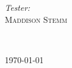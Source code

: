 \begin{titlepage}
\begin{center}
\begin{minipage}{0.4\textwidth}
\begin{flushleft} \large
\emph{Tester:}\\
 \textsc{Maddison Stemm}
\end{flushleft}
\end{minipage}
\begin{minipage}{0.4\textwidth}
\begin{flushright} \large
\end{flushright}
\end{minipage}\\

\vfill

{\large \today}

\end{center}
\end{titlepage}


\newpage

